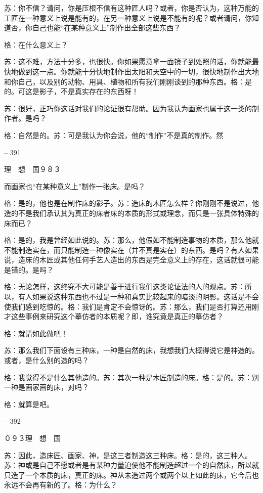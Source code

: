 \documentclass[11pt,oneside]{book}
\begin{document}
\begin{common-format}
    苏：你不信？请问，你是压根不信有这种匠人吗？或者，你是否认为，这种万能的工匠在一种意义上说是能有的，在另一种意义上说是不能有的呢？或者请问，你知道否，你自己也能“在某种意义上”制作出全部这些东西？

    格：在什么意义上？

    苏：这不难，方法十分多，也很快。你如果愿意拿一面镜子到处照的话，你就能最快地做到这一点。你就能十分快地制作出太阳和天空中的一切，很快地制作出大地和你自己，以及别的动物、用具、植物和所有我们刚刚谈到的那种东西。格：是的。可这是影子，不是真实存在的东西呀！

    苏：很好，正巧你这话对我们的论证很有帮助。因为我认为画家也属于这一类的制作者。是吗？

    格：自然是的。苏：可是我认为你会说，他的“制作”不是真的制作。然

    

-- 391

    理　想　国９８３

    而画家也“在某种意义上”制作一张床。是吗？

    格：是的，他也是在制作床的影子。苏：造床的木匠怎么样？你刚刚不是说过，他造的不是我们承认其为真正的床者床的本质的形式或理念，而只是一张具体特殊的床而已？

    格：是的，我是曾经如此说的。苏：那么，他假如不能制造事物的本质，那么他就不能制造实在，而只能制造一种像实在（并不真是实在）的东西。是吗？有人如果说，造床的木匠或其他任何手艺人造出的东西是完全意义上的存在，这话就很可能是错的。是吗？

    格：无论怎样，这终究不大可能是善于进行我们这类论证法的人的观点。苏：所以，有人如果说这种东西也不过是一种和真实比较起来的暗淡的阴影。这话是不会使我们感到吃惊的。格：我们是肯定不会惊讶的。苏：那么，我们是否打算还用刚才这些事例来研究这个摹仿者的本质呢？即，谁究竟是真正的摹仿者？

    格：就请如此做吧！

    苏：那么我们下面设有三种床，一种是自然的床，我想我们大概得说它是神造的。或者，是什么别的造的吗？

    格：我觉得不是什么其他造的。苏：其次一种是木匠制造的床。格：是的。苏：别一种是画家画的床，对吗？

    格：就算是吧。

    

-- 392

    ０９３理　想　国

    苏：因此，造床匠、画家、神，是这三者制造这三种床。格：是的，这三种人。苏：神或是自己不愿或者是有某种力量迫使他不能制造超过一个的自然床，所以就只造了一个本质的床，真正的床。神从未造过两个或两个以上如此的床，它今后也永远不会再有新的了。格：为什么？


\end{common-format}
\end{document}
